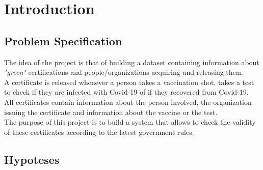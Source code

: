 \documentclass[12pt, a4paper]{article}
\begin{document}
\clearpage

{
    \hypersetup{hidelinks}
    \tableofcontents
}

\listoftodos

\clearpage

\section{Introduction}

\subsection{Problem Specification}

The idea of the project is that of building a dataset containing information about 
\emph{"green"} certifications and people/organizations acquiring and releasing them. \\ 
A certificate is released whenever a person takes a vaccination shot, takes a test to 
check if they are infected with Covid-19 of if they recovered from Covid-19. \\
All certificates contain information about the person 
involved, the organization issuing the certificate and information about the vaccine or 
the test. \\
The purpose of this project is to build a system that allows to check the validity of 
these certificates according to the latest government rules.

\subsection{Hypoteses}
\end{document}
